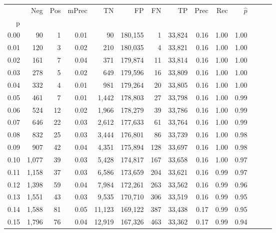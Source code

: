 \begin{tabular}{rrrrrrrrrrrrrr}
\toprule
{} &    Neg &  Pos & mPrec &       TN &       FP &      FN &      TP &  Prec &   Rec & $\hat{p}$ \\
p    &        &      &       &          &          &         &         &       &       &           \\
\midrule
0.00 &     90 &    1 &  0.01 &       90 &  180,155 &       1 &  33,824 &  0.16 &  1.00 &      1.00 \\
0.01 &    120 &    3 &  0.02 &      210 &  180,035 &       4 &  33,821 &  0.16 &  1.00 &      1.00 \\
0.02 &    161 &    7 &  0.04 &      371 &  179,874 &      11 &  33,814 &  0.16 &  1.00 &      1.00 \\
0.03 &    278 &    5 &  0.02 &      649 &  179,596 &      16 &  33,809 &  0.16 &  1.00 &      1.00 \\
0.04 &    332 &    4 &  0.01 &      981 &  179,264 &      20 &  33,805 &  0.16 &  1.00 &      1.00 \\
0.05 &    461 &    7 &  0.01 &    1,442 &  178,803 &      27 &  33,798 &  0.16 &  1.00 &      0.99 \\
0.06 &    524 &   12 &  0.02 &    1,966 &  178,279 &      39 &  33,786 &  0.16 &  1.00 &      0.99 \\
0.07 &    646 &   22 &  0.03 &    2,612 &  177,633 &      61 &  33,764 &  0.16 &  1.00 &      0.99 \\
0.08 &    832 &   25 &  0.03 &    3,444 &  176,801 &      86 &  33,739 &  0.16 &  1.00 &      0.98 \\
0.09 &    907 &   42 &  0.04 &    4,351 &  175,894 &     128 &  33,697 &  0.16 &  1.00 &      0.98 \\
0.10 &  1,077 &   39 &  0.03 &    5,428 &  174,817 &     167 &  33,658 &  0.16 &  1.00 &      0.97 \\
0.11 &  1,158 &   37 &  0.03 &    6,586 &  173,659 &     204 &  33,621 &  0.16 &  0.99 &      0.97 \\
0.12 &  1,398 &   59 &  0.04 &    7,984 &  172,261 &     263 &  33,562 &  0.16 &  0.99 &      0.96 \\
0.13 &  1,551 &   43 &  0.03 &    9,535 &  170,710 &     306 &  33,519 &  0.16 &  0.99 &      0.95 \\
0.14 &  1,588 &   81 &  0.05 &   11,123 &  169,122 &     387 &  33,438 &  0.17 &  0.99 &      0.95 \\
0.15 &  1,796 &   76 &  0.04 &   12,919 &  167,326 &     463 &  33,362 &  0.17 &  0.99 &      0.94 \\

\end{tabular}
